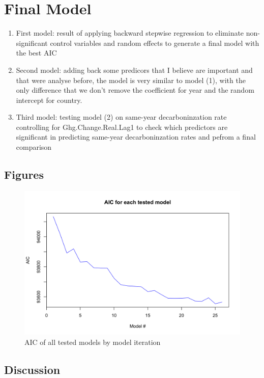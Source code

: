 \section{Final Model}


\begin{enumerate}
    \item First model: result of applying backward stepwise regression to eliminate non-significant control variables and random effects to generate a final model with the best AIC
    \item Second model: adding back some predicors that I believe are important and that were analyse before, the model is very similar to model (1), with the only difference that we don't remove the coefficient for year and the random intercept for country.
    \item Third model: testing model (2) on same-year decarboninzation rate controlling for Ghg.Change.Real.Lag1 to check which predictors are significant in predicting same-year decarboninzation rates and pefrom a final comparison
\end{enumerate}



\subsection{Figures}

\begin{figure}[H]
    \centering
    \includegraphics[width=\linewidth]{../notebooks/R/aic.png}
    \caption{AIC of all tested models by model iteration}
    \label{AIC}
\end{figure}

\subsection{Discussion}

